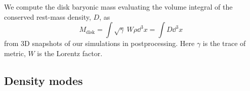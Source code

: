 
We compute the disk baryonic mass evaluating
the volume integral of the conserved rest-mass density, $D$, as 
%
\begin{equation}
\label{eq:method:mdisk}
M_{\text{disk}} = \int \sqrt{\gamma}~W\rho \dd^3 x  = \int D \dd^3 x\, 
\end{equation}
%
from $3$D snapshots of our simulations in postprocessing.
%
Here $\gamma$ is the trace of metric, $W$ is the Lorentz factor. 





\subsection{Density modes} \label{sec:bns_sims:method:modes}


